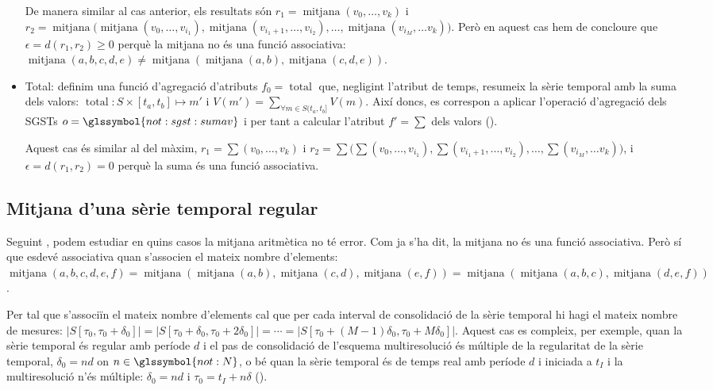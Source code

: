 \begin{itemize}
    De manera similar al cas anterior, els resultats són
    $r_1=\operatorname{mitjana}(v_0,\dotsc, v_k)$ i
    $r_2=\operatorname{mitjana}\big(
    \operatorname{mitjana}(v_0,\dotsc,v_{i_1}),
    \operatorname{mitjana}(v_{i_1+1},\dotsc,v_{i_2}), \dotsc,
    \operatorname{mitjana}(v_{i_M}, \dotsc v_k) \big)$.  Però en
    aquest cas hem de concloure que $\epsilon=d(r_1,r_2)\geq 0$ perquè
    la mitjana no és una funció associativa:
    $\operatorname{mitjana}(a,b,c,d,e) \neq \operatorname{mitjana}(
    \operatorname{mitjana}(a,b), \operatorname{mitjana}(c,d,e))$.
 


  \item Total: definim una funció d'agregació d'atributs
    $f_0=\operatorname{total}$ que, negligint l'atribut de temps,
    resumeix la sèrie temporal amb la suma dels valors:
    $\operatorname{total}: S \times [t_a,t_b] \mapsto m'$ i $V(m') =
    \sum\limits_{\forall m\in S(t_a,t_b]} V(m)$. Així doncs, es
    correspon a aplicar l'operació d'agregació dels \glspl{SGST}
    $o=\glssymbol{not:sgst:sumav}$ i per tant a calcular l'atribut
    $f'=\sum$ dels valors ().

    Aquest cas és similar al del màxim, $r_1=\sum(v_0,\dotsc, v_k)$ i
    $r_2=\sum\big( \sum(v_0,\dotsc,v_{i_1}),
    \sum(v_{i_1+1},\dotsc,v_{i_2}), \dotsc, \sum(v_{i_M}, \dotsc v_k)
    \big)$, i $\epsilon=d(r_1,r_2)=0$ perquè la suma és una funció
    associativa.
    

  \end{itemize}


\subsection{Mitjana d'una sèrie temporal regular}

  Seguint , podem estudiar en quins
  casos la mitjana aritmètica no té error. Com ja s'ha dit, la mitjana
  no és una funció associativa. Però sí que esdevé associativa quan
  s'associen el mateix nombre d'elements:
  $\operatorname{mitjana}(a,b,c,d,e,f) = \operatorname{mitjana}(
  \operatorname{mitjana}(a,b), \operatorname{mitjana}(c,d),
  \operatorname{mitjana}(e,f)) = \operatorname{mitjana}(
  \operatorname{mitjana}(a,b,c), \operatorname{mitjana}(d,e,f))$.

  Per tal que s'associïn el mateix nombre d'elements cal que per cada
  interval de consolidació de la sèrie temporal hi hagi el mateix
  nombre de mesures:
  $|S[\tau_0,\tau_0+\delta_0]|=|S[\tau_0+\delta_0,\tau_0+2\delta_0]|=\dotsb
  = |S[\tau_0+(M-1)\delta_0,\tau_0+M\delta_0]|$.  Aquest cas es
  compleix, per exemple, quan la sèrie temporal és regular amb període
  $d$ i el pas de consolidació de l'esquema multiresolució és múltiple
  de la regularitat de la sèrie temporal, $\delta_0 = nd$ on
  $n\in\glssymbol{not:N}$, o bé quan la sèrie temporal és de temps
  real amb període $d$ i iniciada a $t_I$ i la multiresolució n'és
  múltiple: $\delta_0 = nd$ i $\tau_0 = t_I+n\delta$
  ().


